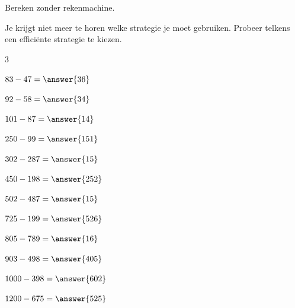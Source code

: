 \documentclass{ximera}
\begin{document}

\begin{oefening}{\oefU\ESS}

Bereken zonder rekenmachine.

Je krijgt niet meer te horen welke strategie je moet gebruiken.
Probeer telkens een efficiënte strategie te kiezen.

\begin{multicols}{3}

\begin{question} \(83-47=\answer{36}\) \end{question}

\begin{question} \(92-58=\answer{34}\) \end{question}

\begin{question} \(101-87=\answer{14}\) \end{question}

\begin{question} \(250-99=\answer{151}\) \end{question}

\begin{question} \(302-287=\answer{15}\) \end{question}

\begin{question} \(450-198=\answer{252}\) \end{question}

\begin{question} \(502-487=\answer{15}\) \end{question}

\begin{question} \(725-199=\answer{526}\) \end{question}

\begin{question} \(805-789=\answer{16}\) \end{question}

\begin{question} \(903-498=\answer{405}\) \end{question}

\begin{question} \(1000-398=\answer{602}\) \end{question}

\begin{question} \(1200-675=\answer{525}\) \end{question}


\end{multicols}
\end{oefening}
\end{document}
